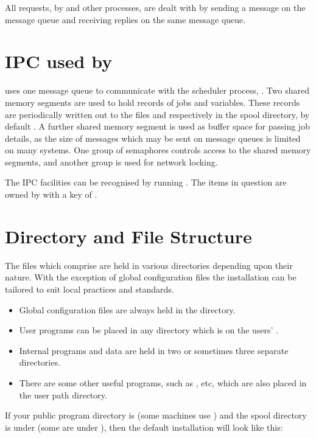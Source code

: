 All requests, by \PrBtq{} and other processes, are dealt with by sending a message on the message queue and receiving
replies on the same message queue.

\section{IPC used by \manualProduct{}}

\ProductName{} uses one message queue to communicate with the scheduler process, . Two shared memory segments are
used to hold records of jobs and variables. These records are periodically written out to the files
 and  respectively in the spool directory, by default \spooldir.
A further shared memory segment is used as buffer space for passing job details, as the size of messages which may be sent on message queues is limited on many systems. One group of semaphores controls access to the shared memory segments, and another group is used for network locking.

The IPC facilities can be recognised by running . The items in question are owned by \batchuser{} with a key of .

\section{Directory and File Structure}
The files which comprise \ProductName{} are held in various directories depending upon their nature. With the exception of global configuration
files the installation can be tailored to suit local practices and
standards.

\begin{itemize}
\item Global configuration files are always held in the \filename{\etcname} directory.
\item User programs can be placed in any directory which is on the \ProductName{} users' .
\item Internal programs and data are held in two or sometimes three separate directories.
\item There are some other useful programs, such as \PrXbRipc{}, \PrXbCjlist{} etc, which are also placed in the user path directory.
\end{itemize}

If your public program directory is  (some machines use ) and the spool
directory is under  (some are under ), then the default installation will look like
this:

